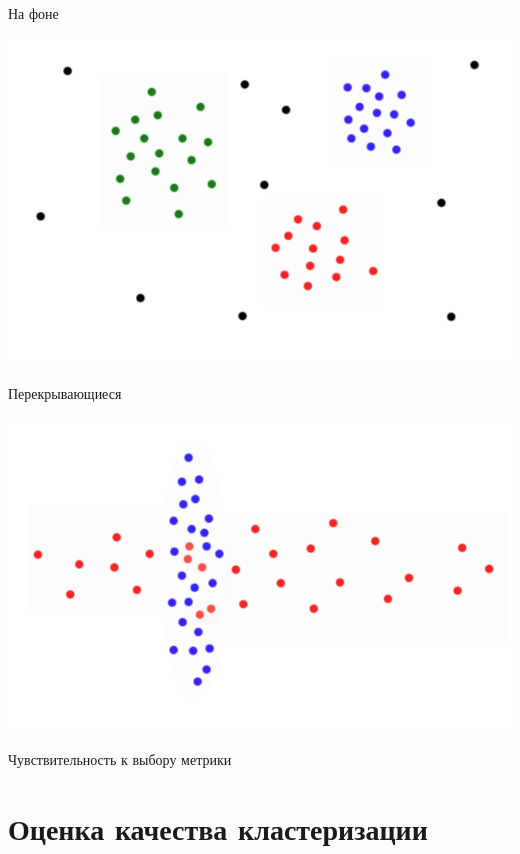 \documentclass[10pt]{beamer}
\begin{document}
\begin{frame}{На фоне}
	\begin{center}
	  \includegraphics[height=0.8 \textheight, keepaspectratio = true]{images/cluster5}  
	\end{center}
\end{frame}

\begin{frame}{Перекрывающиеся}
	\begin{center}
	  \includegraphics[height=0.8 \textheight, keepaspectratio = true]{images/cluster6}  
	\end{center}
\end{frame}

\begin{frame}{Чувствительность к выбору метрики}
\end{frame}

\section{Оценка качества кластеризации}
\end{document}
